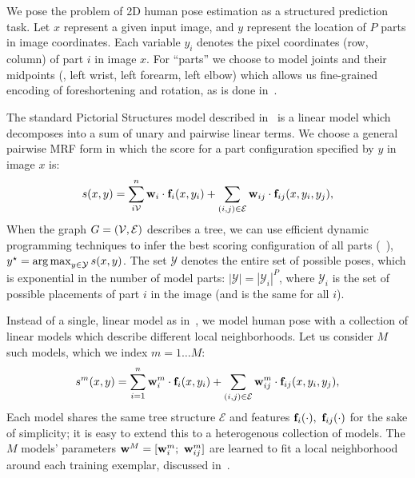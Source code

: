 \section{\LLPS}\label{sec:llps-model}

We pose the problem of 2D human pose estimation as a structured prediction 
task.  Let $x$ represent a given input image, and $y$ represent the location of 
$P$ parts in image coordinates.  Each variable $y_i$ denotes the pixel 
coordinates (row, column) of part $i$ in image $x$.  For ``parts'' we choose to 
model joints and their midpoints (\eg, left wrist, left forearm, left elbow) 
which allows us fine-grained encoding of foreshortening and rotation, as is 
done in~\citep{deva2011,sapp2011}.

The standard Pictorial Structures model described in~ is a linear 
model which decomposes into a sum of unary and pairwise linear terms.  We 
choose a general pairwise MRF form in which the score for a part configuration 
specified by $y$ in image $x$ is:
\begin{align}
 s(x,y) = \sum_{i \mathcal{V}}^n \mathbf{w}_i \cdot \mathbf{f}_i(x,y_i) + \sum_{(i,j) \in \mathcal{E}} \mathbf{w}_{ij} 
\cdot \mathbf{f}_{ij}(x,y_i,y_j),
 \label{eq:llps-ps}
\end{align}
When the graph $G = (\mathcal{V},\mathcal{E})$ describes a tree, we can use efficient dynamic 
programming techniques to infer the best scoring configuration of all parts 
(~), $y^\star = \mathop{\arg\max}_{y \in \mathcal{Y}} s(x,y)$.
The set $\mathcal{Y}$ denotes the entire set of possible poses, which is 
exponential in the number of model parts: $|\mathcal{Y}| = |\mathcal{Y}_i|^P$, 
where $\mathcal{Y}_i$ is the set of possible placements of part $i$ in the 
image (and is the same for all $i$).

Instead of a single, linear model as in~, we model human pose 
with a collection of linear models which describe different local 
neighborhoods.  Let us consider $M$ such models, which we index $m = 1 \ldots 
M$:
\begin{align}
s^m(x,y) = \sum_{i=1}^n \mathbf{w}^m_i \cdot \mathbf{f}_i(x,y_i) + \sum_{(i,j) \in \mathcal{E}} 
\mathbf{w}^m_{ij} \cdot \mathbf{f}_{ij}(x,y_i,y_j),
\end{align}
Each model shares the same tree structure $\mathcal{E}$ and features 
$\mathbf{f}_i(\cdot),~\mathbf{f}_{ij}(\cdot)$ for the sake of simplicity; it is easy to extend 
this to a heterogenous collection of models.  The $M$ models' parameters $\mathbf{w}^M 
= [\mathbf{w}^m_i;~\mathbf{w}^m_{ij}]$ are learned to fit a local neighborhood around each 
training exemplar, discussed in~.

